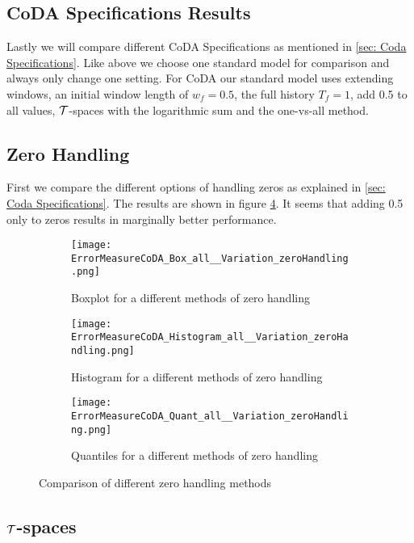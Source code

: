 \subsection{CoDA Specifications Results}
\label{sec: CoDA Specifications Results}

Lastly we will compare different CoDA Specifications as mentioned in \ref{sec: Coda Specifications}. Like above we choose one standard model for comparison and always only change one setting. For CoDA our standard model uses extending windows, an initial window length of $w_f=0.5$, the full history $T_f=1$, add 0.5 to all values, $\mathcal{T}$-spaces with the logarithmic sum and the one-vs-all method. 

\subsection{Zero Handling}
\label{sec: Zero Handling}

First we compare the different options of handling zeros as explained in \ref{sec: Coda Specifications}. The results are shown in figure \ref{fig:Coda zero handling Comp1}. It seems that adding 0.5 only to zeros results in marginally better performance.

\begin{figure}[htb!]
\centering
\begin{subfigure}[b]{0.45\textwidth}
\texttt{[image: ErrorMeasureCoDA\_Box\_all\_\_Variation\_zeroHandling.png]}
\caption{Boxplot for a different methods of zero handling}
\label{fig:Coda zero handling Box}
\end{subfigure}
\hfill
\begin{subfigure}[b]{0.45\textwidth}
\texttt{[image: ErrorMeasureCoDA\_Histogram\_all\_\_Variation\_zeroHandling.png]}
\caption{Histogram for a different methods of zero handling}
\label{fig:Coda zero handling Hist}
\end{subfigure}
\hfill
\begin{subfigure}[b]{0.8\textwidth}
\texttt{[image: ErrorMeasureCoDA\_Quant\_all\_\_Variation\_zeroHandling.png]}
\caption{Quantiles for a different methods of zero handling}
\label{fig:Coda zero handling Quant}
\end{subfigure}
\caption{Comparison of different zero handling methods}
\label{fig:Coda zero handling Comp1}
\end{figure}


\subsection{$\mathcal{T}$-spaces}
\label{sec: Tspaces results}

